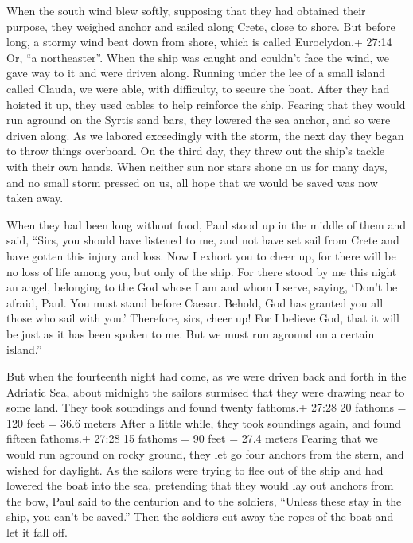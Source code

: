  When the south wind blew softly, supposing that they had
obtained their purpose, they weighed anchor and sailed along Crete,
close to shore.  But before long, a stormy wind beat down
from shore, which is called Euroclydon.+ 27:14 Or, ``a northeaster''.
 When the ship was caught and couldn't face the wind, we
gave way to it and were driven along.  Running under the
lee of a small island called Clauda, we were able, with difficulty, to
secure the boat.  After they had hoisted it up, they used
cables to help reinforce the ship. Fearing that they would run aground
on the Syrtis sand bars, they lowered the sea anchor, and so were driven
along.  As we labored exceedingly with the storm, the next
day they began to throw things overboard.  On the third
day, they threw out the ship's tackle with their own hands.
 When neither sun nor stars shone on us for many days, and
no small storm pressed on us, all hope that we would be saved was now
taken away.

 When they had been long without food, Paul stood up in the
middle of them and said, ``Sirs, you should have listened to me, and not
have set sail from Crete and have gotten this injury and loss.
 Now I exhort you to cheer up, for there will be no loss of
life among you, but only of the ship.  For there stood by
me this night an angel, belonging to the God whose I am and whom I
serve,  saying, `Don't be afraid, Paul. You must stand
before Caesar. Behold, God has granted you all those who sail with you.'
 Therefore, sirs, cheer up! For I believe God, that it will
be just as it has been spoken to me.  But we must run
aground on a certain island.''

 But when the fourteenth night had come, as we were driven
back and forth in the Adriatic Sea, about midnight the sailors surmised
that they were drawing near to some land.  They took
soundings and found twenty fathoms.+ 27:28 20 fathoms = 120 feet = 36.6
meters After a little while, they took soundings again, and found
fifteen fathoms.+ 27:28 15 fathoms = 90 feet = 27.4 meters 
Fearing that we would run aground on rocky ground, they let go four
anchors from the stern, and wished for daylight.  As the
sailors were trying to flee out of the ship and had lowered the boat
into the sea, pretending that they would lay out anchors from the bow,
 Paul said to the centurion and to the soldiers, ``Unless
these stay in the ship, you can't be saved.''  Then the
soldiers cut away the ropes of the boat and let it fall off.

